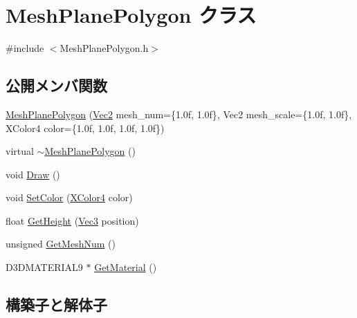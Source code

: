 \hypertarget{class_mesh_plane_polygon}{}\section{Mesh\+Plane\+Polygon クラス}
\label{class_mesh_plane_polygon}


{\ttfamily \#include $<$Mesh\+Plane\+Polygon.\+h$>$}

\subsection*{公開メンバ関数}
\begin{DoxyCompactItemize}
\item 
\mbox{\hyperlink{class_mesh_plane_polygon_a7db07104974799895b42997c71ba8d3e}{Mesh\+Plane\+Polygon}} (\mbox{\hyperlink{_vector3_d_8h_a5ef6e95dfc5f9d3820b71772d99bbc25}{Vec2}} mesh\+\_\+num=\{1.\+0f, 1.\+0f\}, Vec2 mesh\+\_\+scale=\{1.\+0f, 1.\+0f\}, X\+Color4 color=\{1.\+0f, 1.\+0f, 1.\+0f, 1.\+0f\})
\item 
virtual \mbox{\hyperlink{class_mesh_plane_polygon_a6c76a24c3f35cd9a77e6947c22fa4c3d}{$\sim$\+Mesh\+Plane\+Polygon}} ()
\item 
void \mbox{\hyperlink{class_mesh_plane_polygon_a813d5d6897ec0ce2b672cd6e1360e281}{Draw}} ()
\item 
void \mbox{\hyperlink{class_mesh_plane_polygon_a514e1738386a6a4be0d37ea38bd425f2}{Set\+Color}} (\mbox{\hyperlink{_vector3_d_8h_a680c30c4a07d86fe763c7e01169cd6cc}{X\+Color4}} color)
\item 
float \mbox{\hyperlink{class_mesh_plane_polygon_ac04d763b16a962f00c99e3354e45f320}{Get\+Height}} (\mbox{\hyperlink{_vector3_d_8h_ab16f59e4393f29a01ec8b9bbbabbe65d}{Vec3}} position)
\item 
unsigned \mbox{\hyperlink{class_mesh_plane_polygon_a42d1d92dea7878cf59d418aa7ab5106d}{Get\+Mesh\+Num}} ()
\item 
D3\+D\+M\+A\+T\+E\+R\+I\+A\+L9 $\ast$ \mbox{\hyperlink{class_mesh_plane_polygon_a1188cf0072e000227ecce6210ba2778c}{Get\+Material}} ()
\end{DoxyCompactItemize}


\subsection{構築子と解体子}
\mbox{\label{class_mesh_plane_polygon_a7db07104974799895b42997c71ba8d3e}} 
